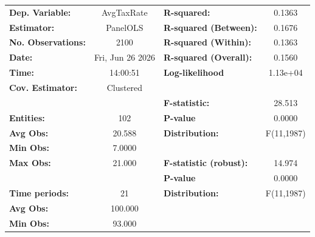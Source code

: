 \begin{center}
\begin{tabular}{lclc}
\toprule
\textbf{Dep. Variable:}                            &     AvgTaxRate     & \textbf{  R-squared:         }   &      0.1363      \\
\textbf{Estimator:}                                &      PanelOLS      & \textbf{  R-squared (Between):}  &      0.1676      \\
\textbf{No. Observations:}                         &        2100        & \textbf{  R-squared (Within):}   &      0.1363      \\
\textbf{Date:}                                     &  Fri, Jun 26 2026  & \textbf{  R-squared (Overall):}  &      0.1560      \\
\textbf{Time:}                                     &      14:00:51      & \textbf{  Log-likelihood     }   &     1.13e+04     \\
\textbf{Cov. Estimator:}                           &     Clustered      & \textbf{                     }   &                  \\
\textbf{}                                          &                    & \textbf{  F-statistic:       }   &      28.513      \\
\textbf{Entities:}                                 &        102         & \textbf{  P-value            }   &      0.0000      \\
\textbf{Avg Obs:}                                  &       20.588       & \textbf{  Distribution:      }   &    F(11,1987)    \\
\textbf{Min Obs:}                                  &       7.0000       & \textbf{                     }   &                  \\
\textbf{Max Obs:}                                  &       21.000       & \textbf{  F-statistic (robust):} &      14.974      \\
\textbf{}                                          &                    & \textbf{  P-value            }   &      0.0000      \\
\textbf{Time periods:}                             &         21         & \textbf{  Distribution:      }   &    F(11,1987)    \\
\textbf{Avg Obs:}                                  &      100.000       & \textbf{                     }   &                  \\
\textbf{Min Obs:}                                  &       93.000       & \textbf{                     }   &                  \\

\end{tabular}
\end{center}

